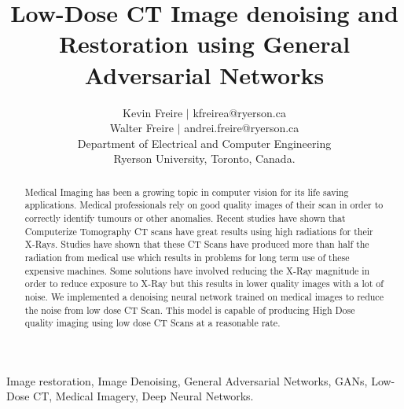 \documentclass[journal]{IEEEtran}
\begin{document}
\title{Low-Dose CT Image denoising and Restoration using General Adversarial Networks}

\author{Kevin Freire $|$ kfreirea@ryerson.ca\\
Walter Freire $|$ andrei.freire@ryerson.ca \\
Department of Electrical and Computer Engineering\\
Ryerson University, Toronto, Canada.}
\maketitle


\begin{abstract}
Medical Imaging has been a growing topic in computer vision for its life saving applications.  Medical professionals rely on good quality images of their scan in order to correctly identify tumours or other anomalies.  Recent studies have shown that Computerize Tomography CT scans have great results using high radiations for their X-Rays.  Studies have shown that these CT Scans have produced more than half the radiation from medical use which results in problems for long term use of these expensive machines.  Some solutions have involved reducing the X-Ray magnitude in order to reduce exposure to X-Ray but this results in lower quality images with a lot of noise.  We implemented a denoising neural network trained on medical images to reduce the noise from low dose CT Scan.  This model is capable of producing High Dose quality imaging using low dose CT Scans at a reasonable rate.


\end{abstract}

\begin{IEEEkeywords}
Image restoration, Image Denoising, General Adversarial Networks, GANs, Low-Dose CT, Medical Imagery, Deep Neural Networks.
\end{IEEEkeywords}

\end{document}
